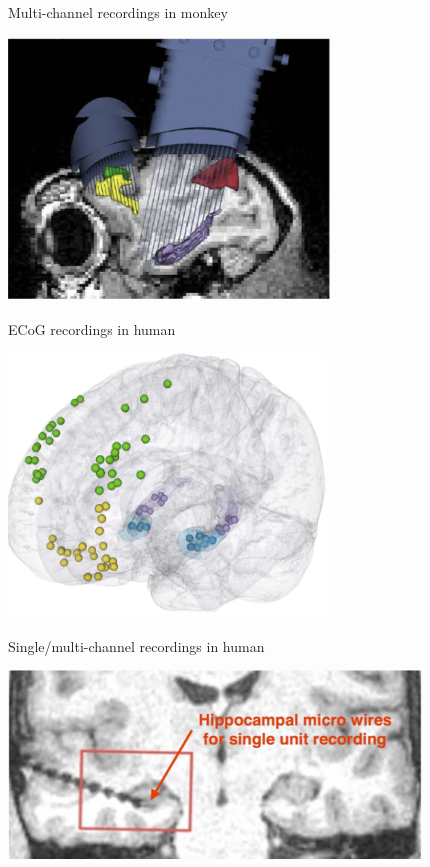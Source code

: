 \documentclass[a0, landscape]{a0poster}
\begin{document}
\begin{multicols}{3}
\begin{minipage}[b]{1\linewidth}
\hfill
\begin{minipage}[]{0.3\linewidth}
\begin{flushleft}Multi-channel recordings in monkey\end{flushleft}
\includegraphics[height=7cm]{nhp-electrodes}
\end{minipage}
\hfill
\begin{minipage}[]{0.2\linewidth}
\begin{flushleft}ECoG recordings in human\end{flushleft}
\includegraphics[height=7cm]{ecog-electrodes}
\end{minipage}
\hfill
\begin{minipage}[]{0.3\linewidth}
\begin{flushleft}Single/multi-channel recordings in human\end{flushleft}
\includegraphics[height=5cm]{depth-electrodes}
\end{minipage}
\hfill
\end{minipage}


\end{multicols}
\end{document}
